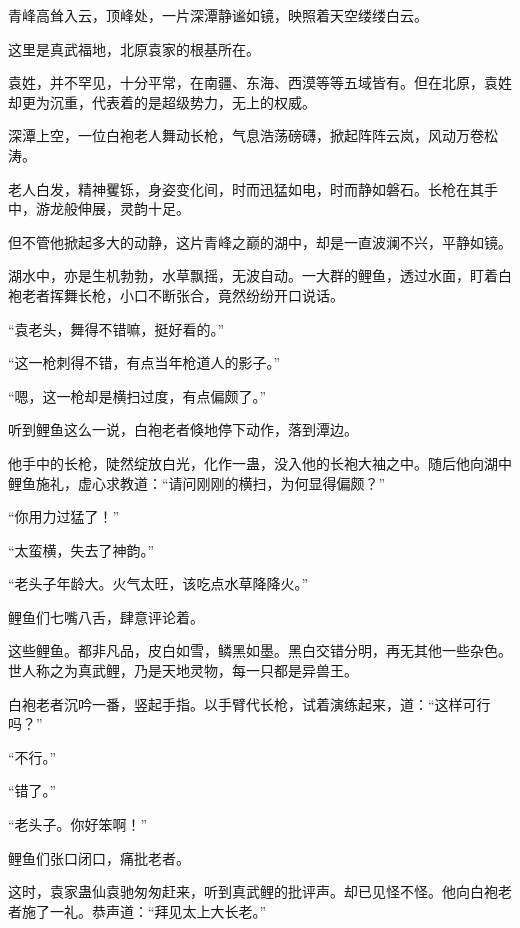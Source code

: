
\begin{this_body}



青峰高耸入云，顶峰处，一片深潭静谧如镜，映照着天空缕缕白云。

这里是真武福地，北原袁家的根基所在。

袁姓，并不罕见，十分平常，在南疆、东海、西漠等等五域皆有。但在北原，袁姓却更为沉重，代表着的是超级势力，无上的权威。

深潭上空，一位白袍老人舞动长枪，气息浩荡磅礴，掀起阵阵云岚，风动万卷松涛。

老人白发，精神矍铄，身姿变化间，时而迅猛如电，时而静如磐石。长枪在其手中，游龙般伸展，灵韵十足。

但不管他掀起多大的动静，这片青峰之巅的湖中，却是一直波澜不兴，平静如镜。

湖水中，亦是生机勃勃，水草飘摇，无波自动。一大群的鲤鱼，透过水面，盯着白袍老者挥舞长枪，小口不断张合，竟然纷纷开口说话。

“袁老头，舞得不错嘛，挺好看的。”

“这一枪刺得不错，有点当年枪道人的影子。”

“嗯，这一枪却是横扫过度，有点偏颇了。”

听到鲤鱼这么一说，白袍老者倏地停下动作，落到潭边。

他手中的长枪，陡然绽放白光，化作一蛊，没入他的长袍大袖之中。随后他向湖中鲤鱼施礼，虚心求教道：“请问刚刚的横扫，为何显得偏颇？”

“你用力过猛了！”

“太蛮横，失去了神韵。”

“老头子年龄大。火气太旺，该吃点水草降降火。”

鲤鱼们七嘴八舌，肆意评论着。

这些鲤鱼。都非凡品，皮白如雪，鳞黑如墨。黑白交错分明，再无其他一些杂色。世人称之为真武鲤，乃是天地灵物，每一只都是异兽王。

白袍老者沉吟一番，竖起手指。以手臂代长枪，试着演练起来，道：“这样可行吗？”

“不行。”

“错了。”

“老头子。你好笨啊！”

鲤鱼们张口闭口，痛批老者。

这时，袁家蛊仙袁驰匆匆赶来，听到真武鲤的批评声。却已见怪不怪。他向白袍老者施了一礼。恭声道：“拜见太上大长老。”


\end{this_body}
